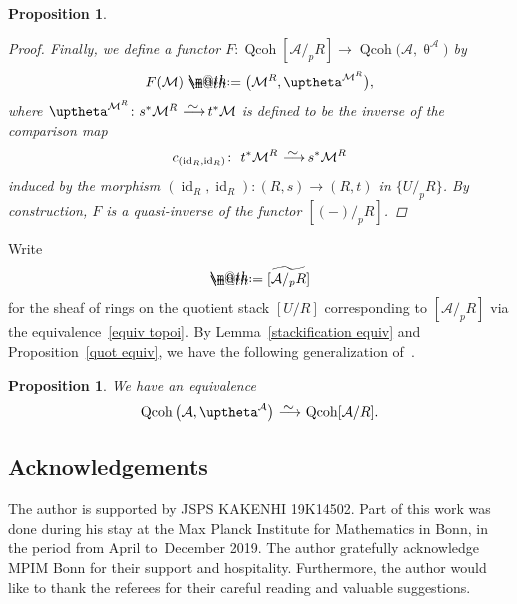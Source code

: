 \documentclass[10pt,a4paper]{amsart}
\makeatletter
\newtheorem{prop}[dfn]{Proposition}
\newcommand*{\defeq}{\mathrel{\rlap{%
 \raisebox{0.3ex}{$\m@th\cdot$}}%
 \raisebox{-0.3ex}{$\m@th\cdot$}}%
 =}
\numberwithin{equation}{section}
\newcommand{\Qcoh}{\operatorname{Qcoh}}
\newcommand{\id}{\operatorname{id}}
\newcommand{\cA}{\mathcal{A}}
\newcommand{\cM}{\mathcal{M}}
\newcommand{\simto}{\,\,\,\,\raisebox{4pt}{$\sim$}{\kern -1.1em \longrightarrow}\,}
\makeatother
\begin{document}
\begin{prop}
\begin{proof}
Finally, we define a functor $F\colon \Qcoh[\cA/_pR]\to \Qcoh\big(\cA,\uptheta^{\cA}\big)$ by
\begin{gather*}
F(\cM)\defeq\big(\cM^R, \uptheta^{\cM^R}\big),
\end{gather*}
where $\uptheta^{\cM^R}\colon s^*\cM^R\simto t^*\cM$ is defined to be the inverse of the comparison map
\begin{gather*}
c_{(\id_R,\id_R)}\colon\ t^*\cM^R\simto s^*\cM^R
\end{gather*}
induced by the morphism $(\id_R,\id_R)\colon (R,s)\to (R,t)$ in $\{U/_pR\}$. By construction, $F$ is a quasi-inverse of the functor $[(-)/_pR]$.
\end{proof}
\end{prop}

Write
\begin{gather*}
[\cA/R]\defeq\widetilde{[\cA/_pR]}
\end{gather*}
for the sheaf of rings on the quotient stack $[U/R]$ corresponding to $[\cA/_pR]$ via the equivalence~\eqref{equiv topoi}. By Lemma~\ref{stackification equiv} and Proposition~\ref{quot equiv}, we have the following
 generalization of~\cite[Proposition~13.1; 06WT]{stacks}.

\begin{prop}\label{main app}
We have an equivalence
\begin{gather*}
\Qcoh\big(\cA,\uptheta^{\cA}\big)\simto \Qcoh[\cA/R].
\end{gather*}
\end{prop}

\subsection*{Acknowledgements}

The author is supported by JSPS KAKENHI 19K14502. Part of this work was done during his stay at the Max Planck Institute for Mathematics in Bonn, in the period from April to~Decem\-ber 2019. The author gratefully acknowledge MPIM Bonn for their support and hospitality. Furthermore, the author would like to thank the referees for their careful reading and valuable suggestions.


\end{document}
